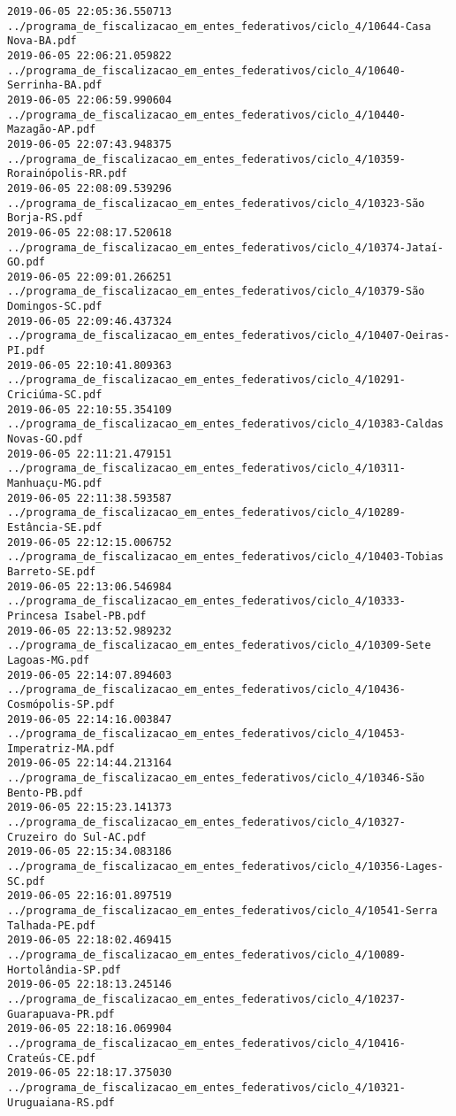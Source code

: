 \begin{lstlisting}
2019-06-05 22:05:36.550713 ../programa_de_fiscalizacao_em_entes_federativos/ciclo_4/10644-Casa Nova-BA.pdf
2019-06-05 22:06:21.059822 ../programa_de_fiscalizacao_em_entes_federativos/ciclo_4/10640-Serrinha-BA.pdf
2019-06-05 22:06:59.990604 ../programa_de_fiscalizacao_em_entes_federativos/ciclo_4/10440-Mazagão-AP.pdf
2019-06-05 22:07:43.948375 ../programa_de_fiscalizacao_em_entes_federativos/ciclo_4/10359-Rorainópolis-RR.pdf
2019-06-05 22:08:09.539296 ../programa_de_fiscalizacao_em_entes_federativos/ciclo_4/10323-São Borja-RS.pdf
2019-06-05 22:08:17.520618 ../programa_de_fiscalizacao_em_entes_federativos/ciclo_4/10374-Jataí-GO.pdf
2019-06-05 22:09:01.266251 ../programa_de_fiscalizacao_em_entes_federativos/ciclo_4/10379-São Domingos-SC.pdf
2019-06-05 22:09:46.437324 ../programa_de_fiscalizacao_em_entes_federativos/ciclo_4/10407-Oeiras-PI.pdf
2019-06-05 22:10:41.809363 ../programa_de_fiscalizacao_em_entes_federativos/ciclo_4/10291-Criciúma-SC.pdf
2019-06-05 22:10:55.354109 ../programa_de_fiscalizacao_em_entes_federativos/ciclo_4/10383-Caldas Novas-GO.pdf
2019-06-05 22:11:21.479151 ../programa_de_fiscalizacao_em_entes_federativos/ciclo_4/10311-Manhuaçu-MG.pdf
2019-06-05 22:11:38.593587 ../programa_de_fiscalizacao_em_entes_federativos/ciclo_4/10289-Estância-SE.pdf
2019-06-05 22:12:15.006752 ../programa_de_fiscalizacao_em_entes_federativos/ciclo_4/10403-Tobias Barreto-SE.pdf
2019-06-05 22:13:06.546984 ../programa_de_fiscalizacao_em_entes_federativos/ciclo_4/10333-Princesa Isabel-PB.pdf
2019-06-05 22:13:52.989232 ../programa_de_fiscalizacao_em_entes_federativos/ciclo_4/10309-Sete Lagoas-MG.pdf
2019-06-05 22:14:07.894603 ../programa_de_fiscalizacao_em_entes_federativos/ciclo_4/10436-Cosmópolis-SP.pdf
2019-06-05 22:14:16.003847 ../programa_de_fiscalizacao_em_entes_federativos/ciclo_4/10453-Imperatriz-MA.pdf
2019-06-05 22:14:44.213164 ../programa_de_fiscalizacao_em_entes_federativos/ciclo_4/10346-São Bento-PB.pdf
2019-06-05 22:15:23.141373 ../programa_de_fiscalizacao_em_entes_federativos/ciclo_4/10327-Cruzeiro do Sul-AC.pdf
2019-06-05 22:15:34.083186 ../programa_de_fiscalizacao_em_entes_federativos/ciclo_4/10356-Lages-SC.pdf
2019-06-05 22:16:01.897519 ../programa_de_fiscalizacao_em_entes_federativos/ciclo_4/10541-Serra Talhada-PE.pdf
2019-06-05 22:18:02.469415 ../programa_de_fiscalizacao_em_entes_federativos/ciclo_4/10089-Hortolândia-SP.pdf
2019-06-05 22:18:13.245146 ../programa_de_fiscalizacao_em_entes_federativos/ciclo_4/10237-Guarapuava-PR.pdf
2019-06-05 22:18:16.069904 ../programa_de_fiscalizacao_em_entes_federativos/ciclo_4/10416-Crateús-CE.pdf
2019-06-05 22:18:17.375030 ../programa_de_fiscalizacao_em_entes_federativos/ciclo_4/10321-Uruguaiana-RS.pdf

\end{lstlisting}
